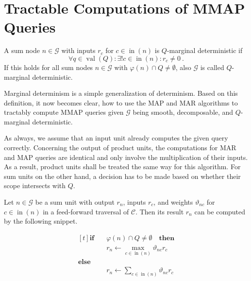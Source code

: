 \documentclass[9pt,fleqn,twoside,twocolumn]{stdglobal}
\DeclareMathOperator{\val}{val}
\DeclareMathOperator{\nodein}{in}
\begin{document}
\section{Tractable Computations of MMAP Queries}
  \begin{definition*}
    A sum node $n\in\mathscr{G}$ with inputs $r_c$ for $c\in\nodein(n)$ is $Q$-marginal deterministic if
    \[
      \forall q\in\val(Q): \exists! c\in\nodein(n): r_c \neq 0 \ .
    \]
    If this holds for all sum nodes $n\in\mathscr{G}$ with $φ(n)\cap Q\neq\emptyset$, also $\mathscr{G}$ is called $Q$-marginal deterministic.
  \end{definition*}

  \noindent
  Marginal determinism is a simple generalization of determinism.
  Based on this definition, it now becomes clear, how to use the MAP and MAR algorithms to tractably compute MMAP queries given $\mathscr{G}$ being smooth, decomposable, and $Q$-marginal deterministic.

  As always, we assume that an input unit already computes the given query correctly.
  Concerning the output of product units, the computations for MAR and MAP queries are identical and only involve the multiplication of their inputs.
  As a result, product units shall be treated the same way for this algorithm.
  For sum units on the other hand, a decision has to be made based on whether their scope intersects with $Q$.

  Let $n\in\mathscr{G}$ be a sum unit with output $r_n$, inputs $r_c$, and  weights $ϑ_{nc}$ for $c\in\nodein(n)$ in a feed-forward traversal of $\mathscr{C}$.
  Then its result $r_n$ can be computed by the following snippet.
  \medskip
  \begin{tcolorbox}[%
    colframe=black,
    colbacktitle=white,
    coltitle=black,
    colback=mathdefback,
    attach boxed title to top center={yshift=-2mm},
    enhanced,
    titlerule=0.1pt,
    boxrule=0.5pt,
    arc=5pt,
    breakable,
    title=Sum Unit Computation for MMAP Algorithm
  ]
    \vspace{-1em}
    \[
      \begin{aligned}[t]
        \mathbf{if}\quad &φ(n) \cap Q \neq \emptyset \quad \mathbf{then} \\
        & r_n \longleftarrow \max_{c\in\nodein(n)} ϑ_{nc}r_c \\
        \mathbf{else} \\
        & r_n \longleftarrow \sum_{c\in\nodein(n)} ϑ_{nc}r_c
      \end{aligned}
    \]
  \end{tcolorbox}
\end{document}
